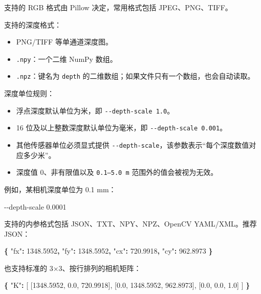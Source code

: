 \documentclass[
  chinese,
  11pt,
  a4paper,
]{article}
\newenvironment{Shaded}{\begin{snugshade}}{\end{snugshade}}
\newcommand{\DataTypeTok}[1]{\textcolor[rgb]{0.13,0.29,0.53}{#1}}
\newcommand{\ExtensionTok}[1]{#1}
\newcommand{\FloatTok}[1]{\textcolor[rgb]{0.00,0.00,0.81}{#1}}
\newcommand{\FunctionTok}[1]{\textcolor[rgb]{0.13,0.29,0.53}{\textbf{#1}}}
\newcommand{\NormalTok}[1]{#1}
\newcommand{\OtherTok}[1]{\textcolor[rgb]{0.56,0.35,0.01}{#1}}
\providecommand{\tightlist}{%
  \setlength{\itemsep}{0pt}\setlength{\parskip}{0pt}}
\begin{document}
支持的 RGB 格式由 Pillow 决定，常用格式包括 JPEG、PNG、TIFF。

支持的深度格式：

\begin{itemize}
\tightlist
\item
  PNG/TIFF 等单通道深度图。
\item
  \texttt{.npy}：一个二维 NumPy 数组。
\item
  \texttt{.npz}：键名为 \texttt{depth}
  的二维数组；如果文件只有一个数组，也会自动读取。
\end{itemize}

深度单位规则：

\begin{itemize}
\tightlist
\item
  浮点深度默认单位为米，即 \texttt{-\/-depth-scale\ 1.0}。
\item
  16 位及以上整数深度默认单位为毫米，即
  \texttt{-\/-depth-scale\ 0.001}。
\item
  其他传感器单位必须显式提供
  \texttt{-\/-depth-scale}，该参数表示``每个深度数值对应多少米''。
\item
  深度值 0、非有限值以及 \texttt{0.1–5.0\ m} 范围外的值会被视为无效。
\end{itemize}

例如，某相机深度单位为 0.1 mm：

\begin{Shaded}
\begin{Highlighting}[]
\ExtensionTok{{-}{-}depth{-}scale}\NormalTok{ 0.0001}
\end{Highlighting}
\end{Shaded}

支持的内参格式包括 JSON、TXT、NPY、NPZ、OpenCV YAML/XML。推荐 JSON：

\begin{Shaded}
\begin{Highlighting}[]
\FunctionTok{\{}
  \DataTypeTok{"fx"}\FunctionTok{:} \FloatTok{1348.5952}\FunctionTok{,}
  \DataTypeTok{"fy"}\FunctionTok{:} \FloatTok{1348.5952}\FunctionTok{,}
  \DataTypeTok{"cx"}\FunctionTok{:} \FloatTok{720.9918}\FunctionTok{,}
  \DataTypeTok{"cy"}\FunctionTok{:} \FloatTok{962.8973}
\FunctionTok{\}}
\end{Highlighting}
\end{Shaded}

也支持标准的 3×3、按行排列的相机矩阵：

\begin{Shaded}
\begin{Highlighting}[]
\FunctionTok{\{}
  \DataTypeTok{"K"}\FunctionTok{:} \OtherTok{[}
    \OtherTok{[}\FloatTok{1348.5952}\OtherTok{,} \FloatTok{0.0}\OtherTok{,} \FloatTok{720.9918}\OtherTok{],}
    \OtherTok{[}\FloatTok{0.0}\OtherTok{,} \FloatTok{1348.5952}\OtherTok{,} \FloatTok{962.8973}\OtherTok{],}
    \OtherTok{[}\FloatTok{0.0}\OtherTok{,} \FloatTok{0.0}\OtherTok{,} \FloatTok{1.0}\OtherTok{]}
  \OtherTok{]}
\FunctionTok{\}}
\end{Highlighting}
\end{Shaded}
\end{document}
